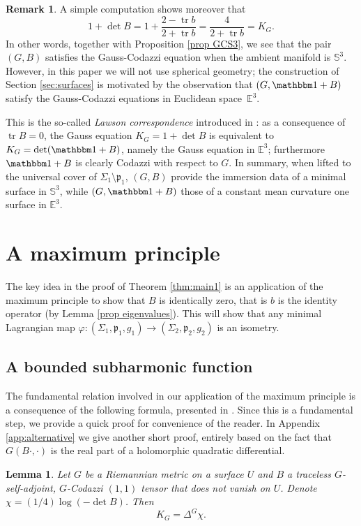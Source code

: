 \documentclass[JEP,XML,SOM,Unicode,NoEqCountersInSection,published]{cedram}
\newtheorem{lemma}[cor]{Lemma}
\theoremstyle{definition}
\newtheorem{remark}[cor]{Remark}
\newcommand{\E}{\mathbb{E}}
\DeclareMathOperator{\tr}{tr}
\begin{document}
\begin{remark} \label{rmk lawson}
A simple computation shows moreover that
\[
1+\det B=1+\frac{2-\tr b}{2+\tr b}=\frac{4}{2+\tr b}=K_G.
\]
In other words, together with Proposition \ref{prop GCS3}, we see that the pair $(G,B)$ satisfies the Gauss-Codazzi equation when the ambient manifold is $\mathbb S^3$. However, in this paper we will not use spherical geometry; the construction of Section \ref{sec:surfaces} is motivated by the observation that $(G,\mathbbm 1+B)$ satisfy the Gauss-Codazzi equations in Euclidean space~$\E^3$.

This is the so-called \emph{Lawson correspondence} introduced in \cite{zbMATH03327055}: as a consequence of $\tr  B=0$, the Gauss equation $K_G=1+\det B$ is equivalent to $K_G=\det(\mathbbm 1+B)$, namely the Gauss equation in $\E^3$; furthermore $\mathbbm 1+B$ is clearly Codazzi with respect to $G$. In summary, when lifted to the universal cover of $\Sigma_1\setminus\mathfrak p_1$, $(G,B)$ provide the immersion data of a minimal surface in $\mathbb S^3$, while $(G,\mathbbm 1+B)$ those of a constant mean curvature one surface in $\mathbb E^3$.
\end{remark}

\section{A maximum principle}

The key idea in the proof of Theorem \ref{thm:main1} is an application of the maximum principle to show that $B$ is identically zero, that is $b$ is the identity operator (by Lemma \ref{prop eigenvalues}). This will show that any minimal Lagrangian map $\varphi:(\Sigma_1,\mathfrak p_1,g_1)\to (\Sigma_2,\mathfrak p_2,g_2)$ is an isometry.

\subsection{A bounded subharmonic function}

The fundamental relation involved in our application of the maximum principle is a consequence of the following formula, presented in \cite[Lem.\,3.11]{zbMATH05200423}. Since this is a fundamental step, we provide a quick proof for convenience of the reader. In Appendix \ref{app:alternative} we give another short proof, entirely based on the fact that $G(B\cdot,\cdot)$ is the real part of a holomorphic quadratic differential.

\begin{lemma}\label{lemma laplace}
Let $G$ be a Riemannian metric on a surface $U$ and $B$ a traceless $G$-self-adjoint, $G$-Codazzi $(1,1)$ tensor that does not vanish on $U$. Denote $\chi=(1/4)\log(-\det B)$. Then
\[
K_G=\Delta^G\chi.
\]
\end{lemma}
\end{document}
